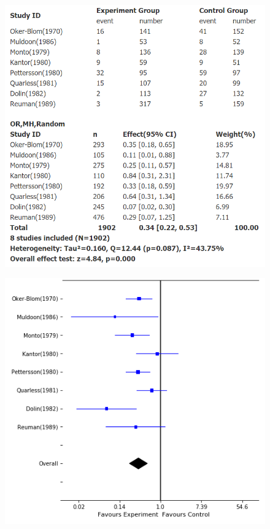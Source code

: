 \documentclass[a4 paper]{article}
\begin{document}
\begin{figure}[H]
	\includegraphics[scale=0.7]{q3_4}
	\centering
	\label{q3_4}
\end{figure}

\begin{figure}[H]
	\includegraphics[scale=0.7]{q3_2}
	\centering
	\label{q3_2}
\end{figure}
\end{document}

